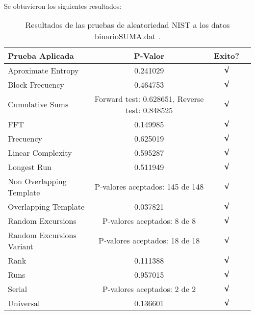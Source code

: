 \documentclass[12pt,3p]{elsarticle}
\begin{document}
Se obtuvieron los siguientes resultados:

\begin{table}[!h]
\caption{Resultados de las pruebas de aleatoriedad NIST a los datos binarioSUMA.dat .}
\label{sample-table}
\vskip 0.15in
\begin{center}
\begin{small}
\begin{sc}
\begin{tabular}{lccr}
\hline

Prueba Aplicada &  P-Valor & Exito? \\
\hline

Aproximate Entropy    &   0.241029  & $\surd$ \\

Block Frecuency  &  0.464753 &  $\surd$  \\

Cumulative Sums    &   Forward test:  0.628651, Reverse test: 0.848525  & $\surd$ \\

FFT    &   0.149985 &   $\surd$      \\

Frecuency     &  0.625019 &  $\surd$   \\

Linear Complexity      &  0.595287  & $\surd$ \\

Longest Run      &   0.511949  &    $\surd$      \\

Non Overlapping Template      & P-valores aceptados: 145 de 148    &     $\surd$          \\

Overlapping Template      &  0.037821  &        $\surd$       \\

Random Excursions      & P-valores aceptados: 8 de 8  &     $\surd$          \\

Random Excursions Variant & P-valores aceptados: 18 de 18  &    $\surd$        \\

Rank &    0.111388    &       $\surd$      \\

Runs &        0.957015  &     $\surd$        \\

Serial &     P-valores aceptados: 2 de 2    &     $\surd$        \\

Universal &     0.136601 &   $\surd$            \\

\hline



\end{tabular}
\end{sc}
\end{small}
\end{center}
\vskip -0.1in
\end{table}
\end{document}
